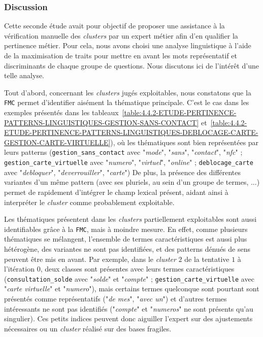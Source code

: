 		\subsubsection{Discussion}
		
			Cette seconde étude avait pour objectif de proposer une assistance à la vérification manuelle des \textit{clusters} par un expert métier afin d'en qualifier la pertinence métier.
			Pour cela, nous avons choisi une analyse linguistique à l'aide de la maximisation de traits pour mettre en avant les mots représentatif et discriminants de chaque groupe de questions.
			Nous discutons ici de l'intérêt d'une telle analyse.
			
			Tout d'abord, concernant les \textit{clusters} jugés exploitables, nous constatons que la \texttt{FMC} permet d'identifier aisément la thématique principale.
			C'est le cas dans les exemples présentés dans les tableaux~\ref{table:4.4.2-ETUDE-PERTINENCE-PATTERNS-LINGUISTIQUES-GESTION-SANS-CONTACT} et~\ref{table:4.4.2-ETUDE-PERTINENCE-PATTERNS-LINGUISTIQUES-DEBLOCAGE-CARTE-GESTION-CARTE-VIRTUELLE}), où les thématiques sont bien représentées par leurs patterns (\texttt{gestion\_sans\_contact} avec "\textit{mode}", "\textit{sans}", "\textit{contact}", "\textit{nfc}" ; \texttt{gestion\_carte\_virtuelle} avec "\textit{numero}", "\textit{virtuel}", "\textit{online}" ; \texttt{deblocage\_carte} avec "\textit{debloquer}", "\textit{deverrouiller}", "\textit{carte}")
			De plus, la présence des différentes variantes d'un même pattern (avec ses pluriels, au sein d'un groupe de termes, ...) permet de rapidement d'intégrer le champ lexical présent, aidant ainsi à interpréter le \textit{cluster} comme probablement exploitable.
			
			Les thématiques présentent dans les \textit{clusters} partiellement exploitables sont aussi identifiables grâce à la \texttt{FMC}, mais à moindre mesure.
			En effet, comme plusieurs thématiques se mélangent, l'ensemble de termes caractéristiques est aussi plus hétérogène, des variantes ne sont pas identifiées, et des patterns dénués de sens peuvent être mis en avant.
			Par exemple, dans le \textit{cluster} $2$ de la tentative $1$ à l'itération $0$, deux classes sont présentes avec leurs termes caractéristiques (\texttt{consultation\_solde} avec "\textit{solde}" et "\textit{compte}" ; \texttt{gestion\_carte\_virtuelle} avec "\textit{carte virtuelle}" et "\textit{numero}"), mais certains termes quelconque sont pourtant sont présentés comme représentatifs ("\textit{de mes}", "\textit{avec un}") et d'autres termes intéressants ne sont pas identifiés ("\textit{compte}" et "\textit{numeros}" ne sont présents qu'au singulier).
			Ces petits indices peuvent donc aiguiller l'expert sur des ajustements nécessaires ou un \textit{cluster} réalisé sur des bases fragiles.
			
